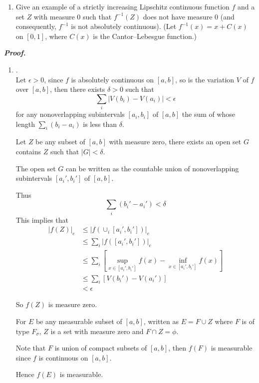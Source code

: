 \documentclass[a4paper,11pt]{article}
\begin{document}
\begin{enumerate}
\begin{enumerate}
 			\item Give an example of a strictly increasing Lipschitz continuous function $f$ and a set $Z$ with measure $0$ such that $f^{-1}(Z)$ does not have measure $0$ (and consequently, $f^{-1}$ is not absolutely continuous). (Let $f^{-1}(x) = x + C(x)$ on $[0, 1]$, where $C(x)$ is the Cantor–Lebesgue function.)\
 		\end{enumerate}

 		\textit{\textbf {Proof.}}\\
 		\begin{enumerate}
 			\item.\\
 			Let $\epsilon > 0$, since $f$ is absolutely continuous on $[a, b]$, so is the variation $V$ of $f$ over $[a, b]$, then there exists $\delta > 0$ such that
 				$$\sum_i |V(b_i) - V(a_i)| < \epsilon$$
 			for any nonoverlapping subintervals $[a_i,b_i]$ of $[a,b]$ the sum of whose length $\sum_i (b_i - a_i)$ is less than $\delta$.\

 			Let $Z$ be any subset of $[a,b]$ with measure zero, there exists an open set $G$ contains $Z$ such that $|G| < \delta$.\

 			The open set $G$ can be written as the countable union of nonoverlapping subintervals $[a_i',b_i']$ of $[a,b]$.\

 			Thus
 				$$\sum_i (b_i' - a_i') < \delta$$
 			This implies that
 				$$\begin{aligned}
 				|f(Z)|_e
 				&\leq |f(\cup_i [a_i',b_i'])|_e\\
 				&\leq \sum_i |f([a_i',b_i'])|_e\\
 				&\leq \sum_i [\underset{x \in [a_i',b_i']}{\sup} f(x) - \underset{x \in [a_i',b_i']}{\inf} f(x)]\\
 				&\leq \sum_i [V(b_i') - V(a_i')]\\
 				&< \epsilon
 				\end{aligned}$$

 			So $f(Z)$ is measure zero.\

 			For $E$ be any measurable subset of $[a, b]$, written as $E = F \cup Z$ where $F$ is of type $F_\sigma$, $Z$ is a set with measure zero and $F \cap Z = \phi$.\

 			Note that $F$ is union of compact subsets of $[a, b]$, then $f(F)$ is measurable since $f$ is continuous on $[a, b]$.\

 			Hence $f(E)$ is measurable.\\




\end{enumerate}
\end{enumerate}
\end{document}
